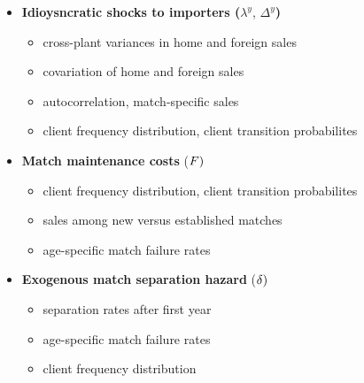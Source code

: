 \documentclass[notes=show]{beamer}
\begin{document}
\begin{frame}%



\begin{itemize}
    \item \textbf{Idioysncratic shocks to importers (}$\lambda ^{y}$, $\Delta^{y}$\textbf{)}

\begin{itemize}
\item cross-plant variances in home and foreign sales

\item covariation of home and foreign sales

\item autocorrelation, match-specific sales

\item client frequency distribution, client transition probabilites
\end{itemize}

\item \textbf{Match maintenance costs} (${\small F)}$

\begin{itemize}
\item client frequency distribution, client transition probabilites

\item sales among new versus established matches

\item age-specific match failure rates
\end{itemize}

\item \textbf{Exogenous match separation hazard} (${\small \delta }{\small )}
$

\begin{itemize}
\item separation rates after first year

\item age-specific match failure rates

\item client frequency distribution
\end{itemize}
\end{itemize}

\end{frame}%
\end{document}

